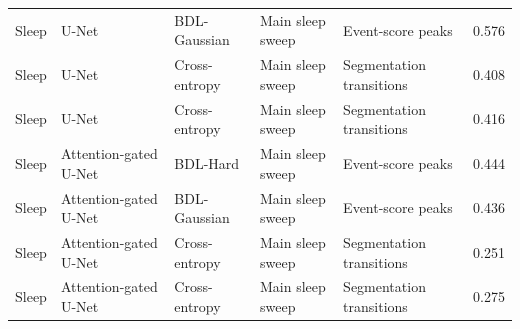 \begin{tabular}{llllll}
Sleep & U-Net & BDL-Gaussian & Main sleep sweep & Event-score peaks & 0.576 \\
Sleep & U-Net & Cross-entropy & Main sleep sweep & Segmentation transitions & 0.408 \\
Sleep & U-Net & Cross-entropy & Main sleep sweep & Segmentation transitions & 0.416 \\
Sleep & Attention-gated U-Net & BDL-Hard & Main sleep sweep & Event-score peaks & 0.444 \\
Sleep & Attention-gated U-Net & BDL-Gaussian & Main sleep sweep & Event-score peaks & 0.436 \\
Sleep & Attention-gated U-Net & Cross-entropy & Main sleep sweep & Segmentation transitions & 0.251 \\
Sleep & Attention-gated U-Net & Cross-entropy & Main sleep sweep & Segmentation transitions & 0.275 \\
\bottomrule
\end{tabular}

